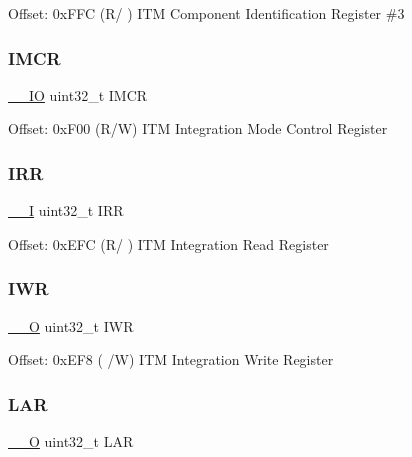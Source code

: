 Offset\+: 0x\+F\+FC (R/ ) I\+TM Component Identification Register \#3 \mbox{\label{struct_i_t_m___type_aa75460116777434aebcd8698b46514cd}} 
\subsubsection{\texorpdfstring{IMCR}{IMCR}}
{\footnotesize\ttfamily \mbox{\hyperlink{core__sc300_8h_aec43007d9998a0a0e01faede4133d6be}{\+\_\+\+\_\+\+IO}} uint32\+\_\+t I\+M\+CR}

Offset\+: 0x\+F00 (R/W) I\+TM Integration Mode Control Register \mbox{\label{struct_i_t_m___type_a5f1859b657556cbeeb743b0da2e71654}} 
\subsubsection{\texorpdfstring{IRR}{IRR}}
{\footnotesize\ttfamily \mbox{\hyperlink{core__sc300_8h_af63697ed9952cc71e1225efe205f6cd3}{\+\_\+\+\_\+I}} uint32\+\_\+t I\+RR}

Offset\+: 0x\+E\+FC (R/ ) I\+TM Integration Read Register \mbox{\label{struct_i_t_m___type_ae13374b53589f16b2fc2c868d779a9c7}} 
\subsubsection{\texorpdfstring{IWR}{IWR}}
{\footnotesize\ttfamily \mbox{\hyperlink{core__sc300_8h_a7e25d9380f9ef903923964322e71f2f6}{\+\_\+\+\_\+O}} uint32\+\_\+t I\+WR}

Offset\+: 0x\+E\+F8 ( /W) I\+TM Integration Write Register \mbox{\label{struct_i_t_m___type_aa2c0f411bbcc7b7c7a558a964996dc11}} 
\subsubsection{\texorpdfstring{LAR}{LAR}}
{\footnotesize\ttfamily \mbox{\hyperlink{core__sc300_8h_a7e25d9380f9ef903923964322e71f2f6}{\+\_\+\+\_\+O}} uint32\+\_\+t L\+AR}

